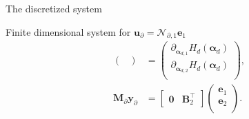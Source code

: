 \documentclass[aspectratio=169]{ISAE-Beamer}
\begin{document}
\begin{frame}{The discretized system}
{\begin{exampleblock}{Finite dimensional system for $\bm{u}_\partial = \mathcal{N}_{\partial, 1} \displaystyle \bm{e}_1$}
\begin{equation*}
\begin{aligned}
\begin{pmatrix}
					\end{pmatrix}
					&= \begin{pmatrix}
						\partial_{\bm{\alpha}_{d, 1}} H_d(\bm{\alpha}_d)\\
						\partial_{\bm{\alpha}_{d, 2}} H_d(\bm{\alpha}_d)\\
					\end{pmatrix}, \\
					\mathbf{M}_\partial {\mathbf{y}_\partial} &= 
					\begin{bmatrix}
						\mathbf{0} & \mathbf{B}_2^\top 
					\end{bmatrix}\begin{pmatrix}
						\mathbf{e}_{1} \\
						\mathbf{e}_{2} \\
					\end{pmatrix}.
				\end{aligned}
			\end{equation*}
		\end{exampleblock}
	}
	

\end{frame}
\end{document}
